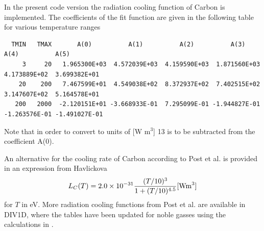 \documentclass[amsmath,amssymb,a4]{revtex4-2}
\begin{document}
In the present code version the radiation cooling function of Carbon is implemented. The coefficients of the fit function are given in the following table for various temperature ranges
\begin{small}\begin{verbatim}
  TMIN   TMAX       A(0)          A(1)          A(2)          A(3)          A(4)          A(5)
     3     20   1.965300E+03  4.572039E+03  4.159590E+03  1.871560E+03  4.173889E+02  3.699382E+01
    20    200   7.467599E+01  4.549038E+02  8.372937E+02  7.402515E+02  3.147607E+02  5.164578E+01
   200   2000  -2.120151E+01 -3.668933E-01  7.295099E-01 -1.944827E-01 -1.263576E-01 -1.491027E-01
\end{verbatim}\end{small}
Note that in order to convert to units of [W m$^3$] 13 is to be subtracted from the coefficient A(0).

An alternative for the cooling rate of Carbon according to Post et al. is provided in an expression from Havlickova \cite{havlickova2013}
\begin{equation}
    L_C(T) = 2.0 \times 10^{-31} {(T/10)^3 \over 1 + (T/10)^{4.5}} [{\rm W m}^3]
\end{equation}
for $T$ in eV.
More radiation cooling functions from Post et al. are available in DIV1D, where the tables have been updated for noble gasses using the calculations in \cite{putterich2019}. 
\end{document}
